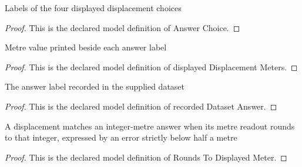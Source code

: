 \begin{definition}
  \label{def:physics:phyx-mini-0750:phyxminiproblems-problemphyxmini0750-answerchoice}
  Labels of the four displayed displacement choices
\end{definition}
\begin{proof}
  This is the declared model definition of Answer Choice.
\end{proof}
\begin{definition}
  \label{def:physics:phyx-mini-0750:phyxminiproblems-problemphyxmini0750-displayeddisplacementmeters}
  Metre value printed beside each answer label
\end{definition}
\begin{proof}
  This is the declared model definition of displayed Displacement Meters.
\end{proof}
\begin{definition}
  \label{def:physics:phyx-mini-0750:phyxminiproblems-problemphyxmini0750-recordeddatasetanswer}
  The answer label recorded in the supplied dataset
\end{definition}
\begin{proof}
  This is the declared model definition of recorded Dataset Answer.
\end{proof}
\begin{definition}
  \label{def:physics:phyx-mini-0750:phyxminiproblems-problemphyxmini0750-roundstodisplayedmeter}
  A displacement matches an integer-metre answer when its metre readout rounds to that integer, expressed by an error strictly below half a metre
\end{definition}
\begin{proof}
  This is the declared model definition of Rounds To Displayed Meter.
\end{proof}
